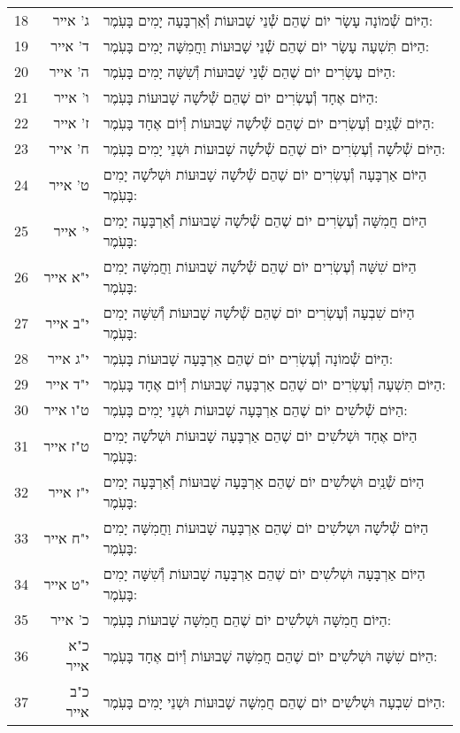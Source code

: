 \documentclass[twoside, openany, parskip=half, 11pt]{book}
\begin{document}
\begin{scriptsize}
\begin{longtable}{ l | r | p{} }
18 & ג' אייר & הַיּוֹם שְׁ֯מוֹנָה עָשָׂר יוֹם שֶׁהֵם שְׁ֯נֵי שָׁבוּעוֹת וְ֯אַרְבָּעָה יָמִים בָּעֹֽמֶר: \\
19 & ד' אייר & הַיּוֹם תִּשְׁעָה עָשָׂר יוֹם שֶׁהֵם שְׁ֯נֵי שָׁבוּעוֹת וַחֲמִשָּׁה יָמִים בָּעֹֽמֶר: \\
20 & ה' אייר & הַיּוֹם עֶשְׂרִים יוֹם שֶׁהֵם שְׁ֯נֵי שָׁבוּעוֹת וְ֯שִׁשָּׁה יָמִים בָּעֹֽמֶר: \\
21 & ו' אייר & הַיּוֹם אֶחָד וְ֯עֶשְׂרִים יוֹם שֶׁהֵם שְׁ֯לֹשָׁה שָׁבוּעוֹת בָּעֹֽמֶר: \\
22 & ז' אייר & הַיּוֹם שְׁ֯נַֽיִם וְ֯עֶשְׂרִים יוֹם שֶׁהֵם שְׁ֯לֹשָׁה שָׁבוּעוֹת וְ֯יוֹם אֶחָד בָּעֹֽמֶר: \\
23 & ח' אייר & הַיּוֹם שְׁ֯לֹשָׁה וְ֯עֶשְׂרִים יוֹם שֶׁהֵם שְׁ֯לֹשָׁה שָׁבוּעוֹת וּשְׁנֵי יָמִים בָּעֹֽמֶר: \\
24 & ט' אייר & הַיּוֹם אַרְבָּעָה וְ֯עֶשְׂרִים יוֹם שֶׁהֵם שְׁ֯לֹשָׁה שָׁבוּעוֹת וּשְׁלֹשָׁה יָמִים בָּעֹֽמֶר: \\
25 & י' אייר & הַיּוֹם חֲמִשָּׁה וְ֯עֶשְׂרִים יוֹם שֶׁהֵם שְׁ֯לֹשָׁה שָׁבוּעוֹת וְ֯אַרְבָּעָה יָמִים בָּעֹֽמֶר: \\
26 & י"א אייר & הַיּוֹם שִׁשָּׁה וְ֯עֶשְׂרִים יוֹם שֶׁהֵם שְׁ֯לֹשָׁה שָׁבוּעוֹת וַחֲמִשָּׁה יָמִים בָּעֹֽמֶר: \\
27 & י"ב אייר & הַיּוֹם שִׁבְעָה וְ֯עֶשְׂרִים יוֹם שֶׁהֵם שְׁ֯לֹשָׁה שָׁבוּעוֹת וְ֯שִׁשָּׁה יָמִים בָּעֹֽמֶר: \\
28 & י"ג אייר & הַיּוֹם שְׁ֯מוֹנָה וְ֯עֶשְׂרִים יוֹם שֶׁהֵם אַרְבָּעָה שָׁבוּעוֹת בָּעֹֽמֶר: \\
29 & י"ד אייר & הַיּוֹם תִּשְׁעָה וְ֯עֶשְׂרִים יוֹם שֶׁהֵם אַרְבָּעָה שָׁבוּעוֹת וְ֯יוֹם אֶחָד בָּעֹֽמֶר: \\
30 & ט"ו אייר & הַיּוֹם שְׁ֯לֹשִׁים יוֹם שֶׁהֵם אַרְבָּעָה שָׁבוּעוֹת וּשְׁנֵי יָמִים בָּעֹֽמֶר: \\
31 & ט"ז אייר & הַיּוֹם אֶחָד וּשְׁלֹשִׁים יוֹם שֶׁהֵם אַרְבָּעָה שָׁבוּעוֹת וּשְׁלֹשָׁה יָמִים בָּעֹֽמֶר: \\
32 & י"ז אייר & הַיּוֹם שְׁ֯נַֽיִם וּשְׁלֹשִׁים יוֹם שֶׁהֵם אַרְבָּעָה שָׁבוּעוֹת וְ֯אַרְבָּעָה יָמִים בָּעֹֽמֶר: \\
33 & י"ח אייר & הַיּוֹם שְׁ֯לֹשָׁה וּשְלֹשִׁים יוֹם שֶׁהֵם אַרְבָּעָה שָׁבוּעוֹת וַחֲמִשָּׁה יָמִים בָּעֹֽמֶר: \\
34 & י"ט אייר & הַיּוֹם אַרְבָּעָה וּשְׁלֹשִׁים יוֹם שֶׁהֵם אַרְבָּעָה שָׁבוּעוֹת וְ֯שִׁשָּׁה יָמִים בָּעֹֽמֶר: \\
35 & כ' אייר & הַיּוֹם חֲמִשָּׁה וּשְׁלֹשִׁים יוֹם שֶׁהֵם חֲמִשָּׁה שָׁבוּעוֹת בָּעֹֽמֶר: \\
36 & כ"א אייר & הַיּוֹם שִׁשָּׁה וּשְׁלֹשִׁים יוֹם שֶׁהֵם חֲמִשָּׁה שָׁבוּעוֹת וְ֯יוֹם אֶחָד בָּעֹֽמֶר: \\
37 & כ"ב אייר & הַיּוֹם שִׁבְעָה וּשְׁלֹשִׁים יוֹם שֶׁהֵם חֲמִשָּׁה שָׁבוּעוֹת וּשְׁנֵי יָמִים בָּעֹֽמֶר: \\

\end{longtable}
\end{scriptsize}
\end{document}
